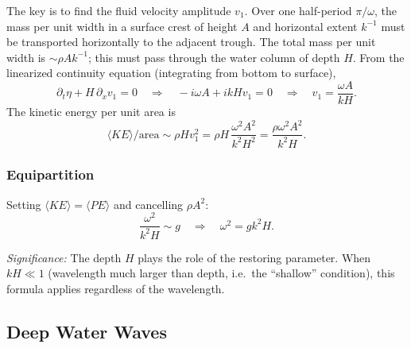 The key is to find the fluid velocity amplitude $v_1$. Over one half-period
$\pi/\omega$, the mass per unit width in a surface crest of height $A$ and
horizontal extent $k^{-1}$ must be transported horizontally to the adjacent
trough. The total mass per unit width is $\sim\rho A k^{-1}$; this must pass
through the water column of depth $H$. From the linearized continuity equation
(integrating from bottom to surface),
\begin{equation}
    \partial_t\eta + H\,\partial_x v_1 = 0
    \quad\Longrightarrow\quad
    -i\omega A + ikHv_1 = 0
    \quad\Longrightarrow\quad
    \boxed{v_1 = \frac{\omega A}{kH}.}
    \label{eq:lec10:sw-vel}
\end{equation}
The kinetic energy per unit area is
\begin{equation}
    \langle KE\rangle/\text{area}
    \sim \rho H v_1^2
    = \rho H\,\frac{\omega^2 A^2}{k^2 H^2}
    = \frac{\rho\omega^2 A^2}{k^2 H}.
    \label{eq:lec10:sw-ke}
\end{equation}

\subsubsection*{Equipartition}

Setting $\langle KE\rangle = \langle PE\rangle$ and cancelling $\rho A^2$:
\begin{equation}
    \frac{\omega^2}{k^2 H} \sim g
    \quad\Longrightarrow\quad
    \omega^2 = gk^2 H.
    \label{eq:lec10:sw-dispersion-deriv}
\end{equation}


\textit{Significance:} The depth $H$ plays the role of the restoring parameter.
When $kH\ll1$ (wavelength much larger than depth, i.e.\ the ``shallow'' condition),
this formula applies regardless of the wavelength.

\subsection{Deep Water Waves}
\label{sec:lec10:deep-water}

